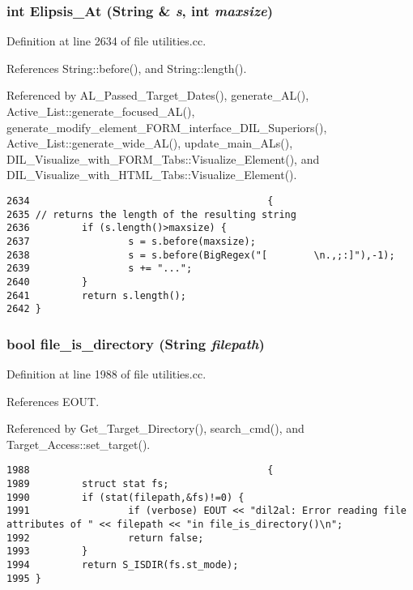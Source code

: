 \subsubsection{\setlength{\rightskip}{0pt plus 5cm}int Elipsis\_\-At ({\bf String} \& {\em s}, int {\em maxsize})}\label{utilities_8cc_a78}




Definition at line 2634 of file utilities.cc.

References String::before(), and String::length().

Referenced by AL\_\-Passed\_\-Target\_\-Dates(), generate\_\-AL(), Active\_\-List::generate\_\-focused\_\-AL(), generate\_\-modify\_\-element\_\-FORM\_\-interface\_\-DIL\_\-Superiors(), Active\_\-List::generate\_\-wide\_\-AL(), update\_\-main\_\-ALs(), DIL\_\-Visualize\_\-with\_\-FORM\_\-Tabs::Visualize\_\-Element(), and DIL\_\-Visualize\_\-with\_\-HTML\_\-Tabs::Visualize\_\-Element().



\footnotesize\begin{verbatim}2634                                         {
2635 // returns the length of the resulting string
2636         if (s.length()>maxsize) {
2637                 s = s.before(maxsize);
2638                 s = s.before(BigRegex("[        \n.,;:]"),-1);
2639                 s += "...";
2640         }
2641         return s.length();
2642 }
\end{verbatim}\normalsize 
{}
\subsubsection{\setlength{\rightskip}{0pt plus 5cm}bool file\_\-is\_\-directory ({\bf String} {\em filepath})}\label{utilities_8cc_a34}




Definition at line 1988 of file utilities.cc.

References EOUT.

Referenced by Get\_\-Target\_\-Directory(), search\_\-cmd(), and Target\_\-Access::set\_\-target().



\footnotesize\begin{verbatim}1988                                         {
1989         struct stat fs;
1990         if (stat(filepath,&fs)!=0) {
1991                 if (verbose) EOUT << "dil2al: Error reading file attributes of " << filepath << "in file_is_directory()\n";
1992                 return false;
1993         }
1994         return S_ISDIR(fs.st_mode);
1995 }
\end{verbatim}\normalsize 
{}

